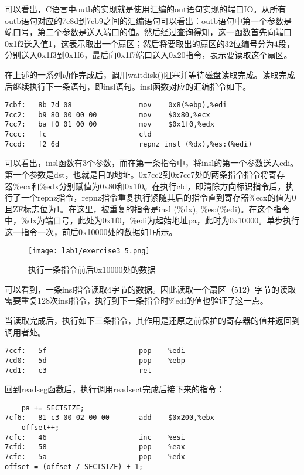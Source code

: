 \begin{exerciseSolution}{3}
\par 可以看出，C语言中outb的实现就是使用汇编的out语句实现的端口IO。从所有outb语句对应的7c8d到7cb9之间的汇编语句可以看出：outb语句中第一个参数是端口号，第二个参数是送入端口的值。然后经过查询得知，这一函数首先向端口0x1f2送入值1，这表示取出一个扇区；然后将要取出的扇区的32位编号分为4段，分别送入0x1f3到0x1f6，最后向0x1f7端口送入0x20指令，表示要读取这个扇区。
\par 在上述的一系列动作完成后，调用waitdisk()阻塞并等待磁盘读取完成。读取完成后继续执行下一条语句，即insl语句。insl函数对应的汇编指令如下。
\begin{lstlisting}
7cbf:	8b 7d 08             	mov    0x8(%ebp),%edi
7cc2:	b9 80 00 00 00       	mov    $0x80,%ecx
7cc7:	ba f0 01 00 00       	mov    $0x1f0,%edx
7ccc:	fc                   	cld
7ccd:	f2 6d                	repnz insl (%dx),%es:(%edi)
\end{lstlisting}
\par 可以看出，insl函数有3个参数，而在第一条指令中，将insl的第一个参数送入edi。第一个参数是dst，也就是目的地址。0x7cc2到0x7cc7处的两条指令指令将寄存器\%ecx和\%edx分别赋值为0x80和0x1f0。在执行cld，即清除方向标识指令后，执行了一个repnz指令，repnz指令重复执行紧随其后的指令直到寄存器\%ecx的值为0且ZF标志位为1。在这里，被重复的指令是insl (\%dx), \%es:(\%edi)。在这个指令中，\%dx为端口号，此处为0x1f0，\%edi为起始地址pa，此时为0x10000。单步执行这一指令一次，前后0x10000处的数据如\ref{fig:exercise3_5}所示。
\begin{figure}[htb]
    \centering
    \texttt{[image: lab1/exercise3\_5.png]}
    \caption{执行一条指令前后0x10000处的数据}
    \label{fig:exercise3_5}
\end{figure}
\par 可以看到，一条insl指令读取4字节的数据。因此读取一个扇区（512）字节的读取需要重复128次insl指令，执行到下一条指令时\%edi的值也验证了这一点。
\par 当读取完成后，执行如下三条指令，其作用是还原之前保护的寄存器的值并返回到调用者处。
\begin{lstlisting}
7ccf:	5f                   	pop    %edi
7cd0:	5d                   	pop    %ebp
7cd1:	c3                   	ret
\end{lstlisting}

\FloatBarrier
\par 回到readseg函数后，执行调用readsect完成后接下来的指令：
\begin{lstlisting}
    pa += SECTSIZE;
7cf6:	81 c3 00 02 00 00    	add    $0x200,%ebx
    offset++;
7cfc:	46                   	inc    %esi
7cfd:	58                   	pop    %eax
7cfe:	5a                   	pop    %edx
offset = (offset / SECTSIZE) + 1;


\end{lstlisting}
\end{exerciseSolution}
